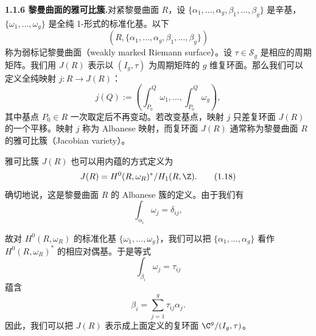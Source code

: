 
\noindent\textbf{1.1.6 黎曼曲面的雅可比簇.}\quad 对紧黎曼曲面 $R$，设 $\{\alpha_1,\dots,\alpha_g,\beta_1,\dots,\beta_g\}$ 是辛基，$\{\omega_1,\dots,\omega_g\}$ 是全纯 1-形式的标准化基。以下
\[
  (R,\{\alpha_1,\dots,\alpha_g,\beta_1,\dots,\beta_g\})
\]
称为弱标记黎曼曲面（weakly marked Riemann surface）。设 $\tau\in\mathscr{S}_g$ 是相应的周期矩阵。我们用 $J(R)$ 表示以 $(I_g,\tau)$ 为周期矩阵的 $g$ 维复环面。那么我们可以定义全纯映射 $j:R\to J(R)$：
\begin{equation}
  j(Q):=\left(\int_{P_0}^{Q}\omega_1,\dots,\int_{P_0}^{Q}\omega_g\right), \tag{1.17}
\end{equation}
其中基点 $P_0\in R$ 一次取定后不再变动。若改变基点，映射 $j$ 只差复环面 $J(R)$ 的一个平移。映射 $j$ 称为 Albanese 映射，而复环面 $J(R)$ 通常称为黎曼曲面 $R$ 的雅可比簇（Jacobian variety）。

雅可比簇 $J(R)$ 也可以用内蕴的方式定义为
\begin{equation}
  J(R)=H^0(R,\omega_R)^*/H_1(R,\Z). \tag{1.18}
\end{equation}
确切地说，这是黎曼曲面 $R$ 的 Albanese 簇的定义。由于我们有
\[
  \int_{\alpha_i}\omega_j=\delta_{ij},
\]

故对 $H^0(R,\omega_R)$ 的标准化基 $\{\omega_1,\dots,\omega_g\}$，我们可以把 $\{\alpha_1,\dots,\alpha_g\}$ 看作 $H^0(R,\omega_R)^*$ 的相应对偶基。于是等式
\[
  \int_{\beta_i}\omega_j=\tau_{ij}
\]
蕴含
\[
  \beta_i=\sum_{j=1}^{g}\tau_{ij}\alpha_j .
\]
因此，我们可以把 $J(R)$ 表示成上面定义的复环面 $\C^g/(I_g,\tau)$。

